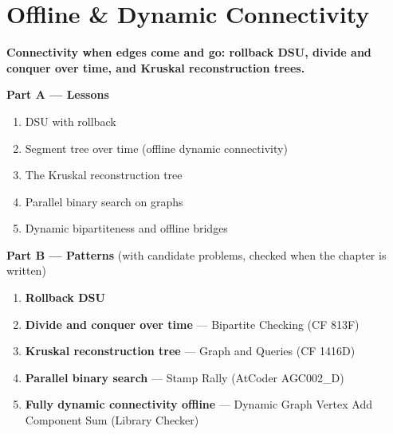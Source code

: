 \chapter{Offline \& Dynamic Connectivity}
\label{ch:offline_connectivity}

\begin{tcolorbox}[enhanced, colback=white, colframe=secondaryblue, boxrule=1pt, arc=2mm]
\textbf{\large\textcolor{primaryblue}{Connectivity when edges come and go: rollback DSU, divide and conquer over time, and Kruskal reconstruction trees.}}
\end{tcolorbox}


\begin{plannedbox}
\textbf{Part A --- Lessons}
\begin{enumerate}[leftmargin=*, label=\textbf{A\arabic*.}, itemsep=1pt]
    \item DSU with rollback
    \item Segment tree over time (offline dynamic connectivity)
    \item The Kruskal reconstruction tree
    \item Parallel binary search on graphs
    \item Dynamic bipartiteness and offline bridges
\end{enumerate}
\textbf{Part B --- Patterns} (with candidate problems, checked when the chapter is written)
\begin{enumerate}[leftmargin=*, label=\textbf{P\arabic*.}, itemsep=1pt]
    \item \textbf{Rollback DSU}
    \item \textbf{Divide and conquer over time} --- Bipartite Checking {\small\color{darkgray}(CF 813F)}
    \item \textbf{Kruskal reconstruction tree} --- Graph and Queries {\small\color{darkgray}(CF 1416D)}
    \item \textbf{Parallel binary search} --- Stamp Rally {\small\color{darkgray}(AtCoder AGC002\_D)}
    \item \textbf{Fully dynamic connectivity offline} --- Dynamic Graph Vertex Add Component Sum {\small\color{darkgray}(Library Checker)}
\end{enumerate}
\end{plannedbox}

